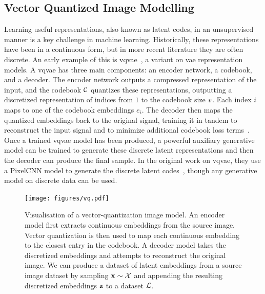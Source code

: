 
\subsection{Vector Quantized Image Modelling}
\label{subsec:vqmodelling}
Learning useful representations, also known as latent codes, in an unsupervised
manner is a key challenge in machine learning. Historically, these
representations have been in a continuous form, but in more recent literature
they are often discrete. An early example of this is
\gls{vqvae}~\cite{oord2017vqvae}, a variant on \gls{vae} representation models.
A \gls{vqvae} has three main components: an encoder network, a codebook, and a
decoder. The encoder network outputs a compressed representation of the input,
and the codebook $\mathcal{C}$ quantizes these representations, outputting a
discretized representation of indices from $1$ to the codebook size
$v$. Each index $i$ maps to one of the codebook embeddings $e_i$.
The decoder then maps the quantized embeddings back to the original signal,
training it in tandem to reconstruct the input signal and to minimize additional
codebook loss terms~\cite{oord2017vqvae}. Once a trained \gls{vqvae} model has
been produced, a powerful auxiliary generative model can be trained to generate
these discrete latent representations and then the decoder can produce the final
sample. In the original work on \gls{vqvae}, they use a PixelCNN model to
generate the discrete latent codes~\cite{oord2017vqvae}, though any generative
model on discrete data can be used.

\begin{figure}[ht!]
    \centering
    \texttt{[image: figures/vq.pdf]}
    \caption{
        Visualisation of a vector-quantization image model. An encoder model
        first extracts continuous embeddings from the source image. Vector
        quantization is then used to map each continuous embedding to the
        closest entry in the codebook. A decoder model takes the discretized
        embeddings and attempts to reconstruct the original image. We can
        produce a dataset of latent embeddings from a source image dataset 
        by sampling $\mathbf{x} \sim \mathcal{X}$ and appending the resulting
        discretized embeddings $\mathbf{z}$ to a dataset $\mathcal{L}$.
    }
\end{figure}

